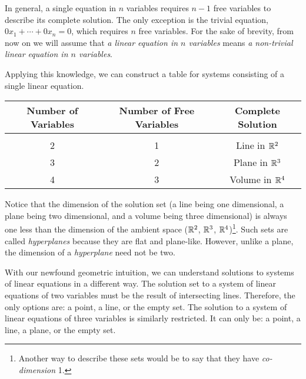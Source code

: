 	In general, a single equation in $n$ variables requires $n-1$ free variables to describe its complete
	solution. The only exception is the trivial equation, $0x_1+\cdots +0x_n=0$, which requires $n$ free variables.
	For the sake of brevity, from now on we will assume that \emph{a linear equation in $n$ variables} means 
	\emph{a non-trivial
	linear equation in $n$ variables}.

	Applying this knowledge, we can construct a table for systems consisting of a single linear equation.

	\begin{center}
		\begin{tabular}{ccc}
			Number of Variables & Number of Free Variables & Complete Solution\\
			\hline\\[-9pt]
			2 & 1 & Line in $\mathbb{R}^2$\\
			3 & 2 & Plane in $\mathbb{R}^3$\\
			4 & 3 & Volume in $\mathbb{R}^4$\\
		\end{tabular}
	\end{center}

	Notice that the dimension of the solution set (a line being one dimensional, a plane being two dimensional, and a volume
	being three dimensional) is always one less than the dimension of the ambient space ($\mathbb{R}^2$, $\mathbb{R}^3$, $\mathbb{R}^4$)\footnote{
		Another way to describe these sets would be to say that they have \emph{co-dimension} 1.}.
	Such sets are called \emph{hyperplanes} because they are flat and plane-like. However, unlike a plane,
	the dimension of a \emph{hyperplane} need not be two.

	\medskip
	With our newfound geometric intuition, we can understand solutions to systems of linear equations in a different way.
	The solution set to a system of linear equations of two variables must be the result of intersecting lines. Therefore,
	the only options are: a point, a line, or the empty set. The solution to a system of linear equations of three variables
	is similarly restricted. It can only be: a point, a line, a plane, or the empty set.
	
